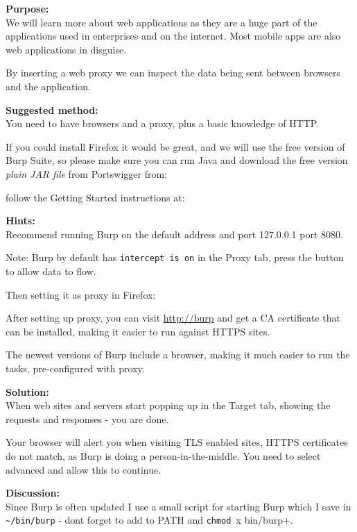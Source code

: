 \documentclass[a4paper,11pt,notitlepage]{report}
\begin{document}
{\bf Purpose:}\\
We will learn more about web applications as they are a huge part of the applications used in enterprises and on the internet. Most mobile apps are also web applications in disguise.

By inserting a web proxy we can inspect the data being sent between browsers and the application.

{\bf Suggested method:}\\
You need to have browsers and a proxy, plus a basic knowledge of HTTP.

If you could install Firefox it would be great, and we will use the
free version of Burp Suite, so please make sure you can run Java and
download the free version \emph{plain JAR file} from Portswigger from:


follow the Getting Started instructions at:\\


{\bf Hints:}\\
Recommend running Burp on the default address and port 127.0.0.1 port 8080.

Note: Burp by default has \verb+intercept is on+ in the Proxy tab, press the button to allow data to flow.


Then setting it as proxy in Firefox:


After setting up proxy, you can visit \url{http://burp} and get a CA certificate that can be installed, making it easier to run against HTTPS sites.

The newest versions of Burp include a browser, making it much easier to run the tasks, pre-configured with proxy.

{\bf Solution:}\\
When web sites and servers start popping up in the Target tab, showing the requests and responses - you are done.

Your browser will alert you when visiting TLS enabled sites, HTTPS certificates do not match, as Burp is doing a person-in-the-middle. You need to select advanced and allow this to continue.

{\bf Discussion:}\\
Since Burp is often updated I use a small script for starting Burp which I save in \verb+~/bin/burp+ - dont forget to add to PATH and \verb+chmod +x bin/burp+.
\end{document}

